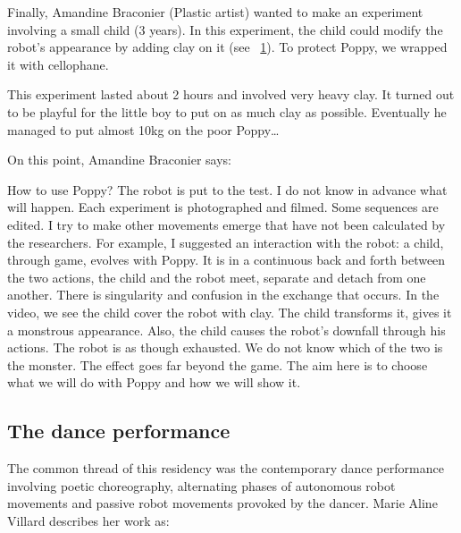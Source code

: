 Finally, Amandine Braconier (Plastic artist) wanted to make an experiment involving a small child (3 years). In this experiment, the child could modify the robot’s appearance by adding clay on it (see \figurename~\ref{fig:clay_on_poppy}). To protect Poppy, we wrapped it with cellophane.

\begin{figure}[tb]
\centering
    \hfil
    \caption{}
    \label{fig:clay_on_poppy}
\end{figure}

This experiment lasted about 2 hours and involved very heavy  clay. It turned out to be playful for the little boy to put on as much clay as possible. Eventually he managed to put almost 10kg on the poor Poppy\dots

On this point, Amandine Braconier says:
\begin{formal}
    How to use Poppy? The robot is put to the test. I do not know in advance what will happen. Each experiment is photographed and filmed. Some sequences are edited. I try to make other movements emerge that have not been calculated by the researchers. For example, I suggested an interaction with the robot: a child, through game, evolves with Poppy. It is in a continuous back and forth  between the two actions, the child and the robot meet, separate and detach from one another. There is singularity and confusion in the exchange that occurs. In the video, we see the child cover the robot with clay. The child transforms it, gives it a monstrous appearance. Also, the child causes the robot’s downfall through his actions. The robot is as though exhausted. We do not know which of the two is the monster. The effect goes far beyond the game. The aim here is to choose what we will do with Poppy and how we will show it.

\end{formal}


\subsection{The dance performance} %

The common thread of this residency was the contemporary dance performance involving poetic choreography, alternating phases of autonomous robot movements and passive robot movements provoked by the dancer. Marie Aline Villard describes her work as:

